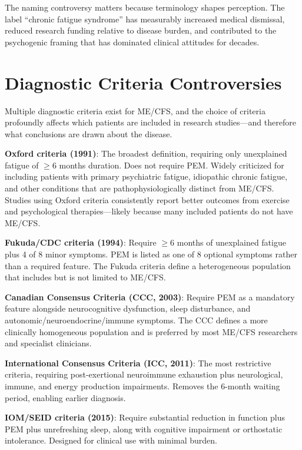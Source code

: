 The naming controversy matters because terminology shapes perception. The label ``chronic fatigue syndrome'' has measurably increased medical dismissal, reduced research funding relative to disease burden, and contributed to the psychogenic framing that has dominated clinical attitudes for decades.

\section{Diagnostic Criteria Controversies}
\label{sec:diagnostic-controversies}

Multiple diagnostic criteria exist for ME/CFS, and the choice of criteria profoundly affects which patients are included in research studies---and therefore what conclusions are drawn about the disease.

\textbf{Oxford criteria (1991)}: The broadest definition, requiring only unexplained fatigue of $\geq$6 months duration. Does not require PEM. Widely criticized for including patients with primary psychiatric fatigue, idiopathic chronic fatigue, and other conditions that are pathophysiologically distinct from ME/CFS. Studies using Oxford criteria consistently report better outcomes from exercise and psychological therapies---likely because many included patients do not have ME/CFS.

\textbf{Fukuda/CDC criteria (1994)}: Require $\geq$6 months of unexplained fatigue plus 4 of 8 minor symptoms. PEM is listed as one of 8 optional symptoms rather than a required feature. The Fukuda criteria define a heterogeneous population that includes but is not limited to ME/CFS.

\textbf{Canadian Consensus Criteria (CCC, 2003)}: Require PEM as a mandatory feature alongside neurocognitive dysfunction, sleep disturbance, and autonomic/neuroendocrine/immune symptoms. The CCC defines a more clinically homogeneous population and is preferred by most ME/CFS researchers and specialist clinicians.

\textbf{International Consensus Criteria (ICC, 2011)}: The most restrictive criteria, requiring post-exertional neuroimmune exhaustion plus neurological, immune, and energy production impairments. Removes the 6-month waiting period, enabling earlier diagnosis.

\textbf{IOM/SEID criteria (2015)}: Require substantial reduction in function plus PEM plus unrefreshing sleep, along with cognitive impairment or orthostatic intolerance. Designed for clinical use with minimal burden.

